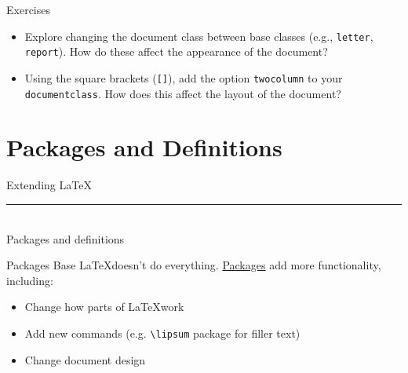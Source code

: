\documentclass{beamer}
\begin{document}
{  \begin{frame}{Exercises}
    \begin{itemize}
      \item Explore changing the document class between base classes (e.g., \texttt{letter}, \texttt{report}). How do these affect the appearance of the document?
      \item Using the square brackets (\texttt{[]}), add the option \texttt{twocolumn} to your \texttt{documentclass}. How does this affect the layout of the document?
    \end{itemize}
  \end{frame}

  \section{Packages and Definitions}

  \begin{frame}[plain]
    \vfill
    \centering
    \begin{beamercolorbox}[sep=8pt,center,shadow=true,rounded=true]{Extending LaTeX}
      \insertsectionhead\par%
      \color{davisblue}\noindent\rule{10cm}{1pt} \\
      \footnotesize{Packages and definitions}
    \end{beamercolorbox}
    \vfill
  \end{frame}

  \begin{frame}{Packages}
    Base \LaTeX doesn't do everything. \underline{Packages} add more functionality, including:
    \begin{itemize}
      \item Change how parts of \LaTeX work
      \item Add new commands (e.g. \texttt{\textbackslash lipsum} package for filler text)
      \item Change document design
    \end{itemize}
  \end{frame}



}
\end{document}
